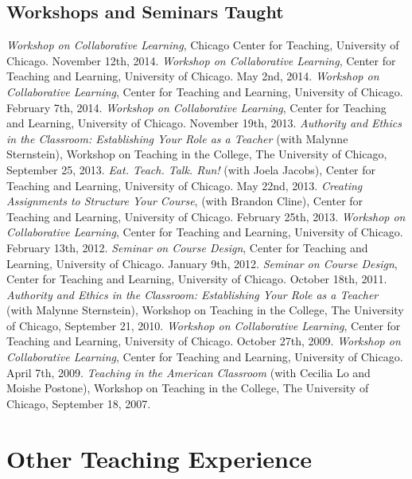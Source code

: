 \documentclass{resume}
\begin{document}
\subsection*{Workshops and Seminars Taught}
\begin{category}{}
\citembullet \emph{Workshop on Collaborative Learning}, Chicago Center for Teaching, University of Chicago. November 12th, 2014.
\citembullet \emph{Workshop on Collaborative Learning}, Center for Teaching and Learning, University of Chicago. May 2nd, 2014.
\citembullet \emph{Workshop on Collaborative Learning}, Center for Teaching and Learning, University of Chicago. February 7th, 2014.
\citembullet \emph{Workshop on Collaborative Learning}, Center for Teaching and Learning, University of Chicago. November 19th, 2013.
\citembullet \emph{Authority and Ethics in the Classroom: Establishing Your Role as a Teacher} (with Malynne Sternstein), Workshop on Teaching in the College, The University of Chicago, September 25, 2013.
\citembullet \emph{Eat. Teach. Talk. Run!} (with Joela Jacobs), Center for Teaching and Learning, University of Chicago. May 22nd, 2013.
\citembullet \emph{Creating Assignments to Structure Your Course}, (with Brandon Cline), Center for Teaching and Learning, University of Chicago. February 25th, 2013.
\citembullet \emph{Workshop on Collaborative Learning}, Center for Teaching and Learning, University of Chicago. February 13th, 2012.
\citembullet \emph{Seminar on Course Design}, Center for Teaching and Learning, University of Chicago. January 9th, 2012.
\citembullet \emph{Seminar on Course Design}, Center for Teaching and Learning, University of Chicago. October 18th, 2011.
\citembullet \emph{Authority and Ethics in the Classroom: Establishing Your Role as a Teacher} (with Malynne Sternstein), Workshop on Teaching in the College, The University of Chicago, September 21, 2010.
\citembullet \emph{Workshop on Collaborative Learning}, Center for Teaching and Learning, University of Chicago. October 27th, 2009.
\citembullet \emph{Workshop on Collaborative Learning}, Center for Teaching and Learning, University of Chicago. April 7th, 2009. 
\citembullet \emph{Teaching in the American Classroom} (with Cecilia Lo and Moishe Postone), Workshop on Teaching in the College, The University of Chicago, September 18, 2007.
\end{category}


\pagebreak


\section*{\hspace{-1cm}Other Teaching Experience}
\end{document}
